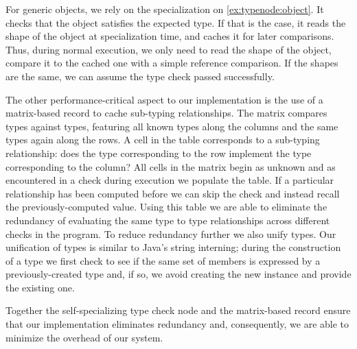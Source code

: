 For generic objects, we rely on the specialization on \cref{ex:typenode:object}.
It checks that the object satisfies the expected type.
If that is the case, it reads the shape of the object at specialization time,
and caches it for later comparisons.
Thus, during normal execution,
we only need to read the shape of the object, compare it to the cached one
with a simple reference comparison.
If the shapes are the same, we can assume the type check passed successfully.

The other performance-critical aspect to our implementation
is the use of a matrix-based record to cache sub-typing relationships.
The matrix compares types against types,
featuring all known types along the columns and the same types again along the rows.
A cell in the table corresponds to a sub-typing relationship:
does the type corresponding to the row implement
the type corresponding to the column?
All cells in the matrix begin as unknown and as 
encountered in a check during execution
we populate the table.
If a particular relationship has been computed before
we can skip the check and instead recall the previously-computed value.
Using this table we are able to eliminate the redundancy of evaluating
the same type to type relationships across different checks in the program. To reduce redundancy further we also unify types.
Our unification of types is similar to Java's string interning; 
during the construction of a type we first check to see if the same
set of members is expressed by a previously-created type and, if so,
we avoid creating the new instance and provide the existing one.

Together the self-specializing type check node and the matrix-based record
ensure that our implementation eliminates redundancy and,
consequently, we are able to minimize the overhead of our system. 

